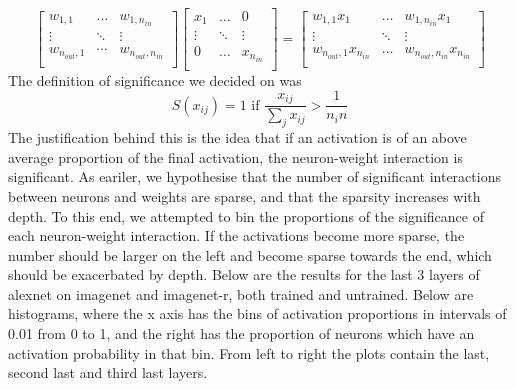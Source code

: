 \documentclass{article}
\begin{document}
        \[
            \begin{bmatrix}
                w_{1,1} & \dots & w_{1,n_{in}} \\
                \vdots & \ddots & \vdots \\
                w_{n_{out}, 1} & \cdots & w_{n_{out}, n_{in}} \\
            \end{bmatrix}
            \begin{bmatrix}
                x_1  & \dots & 0 \\
                \vdots & \ddots & \vdots \\
                0 & \dots & x_{n_{in}} \\
            \end{bmatrix}
            = 
            \begin{bmatrix}
                w_{1,1}x_1  & \dots & w_{1,n_{in}}x_1 \\
                \vdots & \ddots & \vdots \\
                w_{n_{out}, 1}x_{n_{in}} & \dots & w_{n_{out}, n_{in}}x_{n_{in}} \\
            \end{bmatrix}
        \]
    The definition of significance we decided on was 
    \[S(x_{ij}) = 1 \text{ if } \frac{x_{ij}}{\sum_j x_{ij}} > \frac{1}{n_in} \]
    The justification behind this is the idea that if an activation is of an above average proportion of the final activation, the neuron-weight interaction is significant.
    As eariler, we hypothesise that the number of significant interactions between neurons and weights are sparse, and that the sparsity increases with depth. To this end, we attempted to bin the proportions of the significance of each neuron-weight interaction. If the activations become more sparse, the number should be larger on the left and become sparse towards the end, which should be exacerbated by depth. Below are the results for the last 3 layers of alexnet on imagenet and imagenet-r, both trained and untrained. Below are histograms, where the x axis has the bins of activation proportions in intervals of 0.01 from 0 to 1, and the right has the proportion of neurons which have an activation probability in that bin. From left to right the plots contain the last, second last and third last layers.
\end{document}
